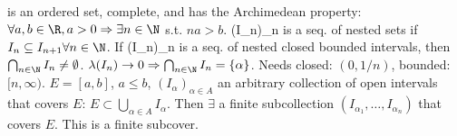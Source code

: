  is an ordered set, complete, and has the Archimedean property:
$\forall a, b \in \R, a > 0 \Rightarrow \exists n \in \N$ s.t. $na > b$.
 (I_n)_{n \in \N} is a seq. of nested sets if $I_n \subseteq I_{n+1} \forall n \in \N$.
If (I_n)_{n \in \N} is a seq. of nested closed bounded intervals, then $\bigcap_{n \in \N} I_n \neq \emptyset$.
$\lambda(I_n) \to 0 \Rightarrow \bigcap_{n \in \N} I_n = \{\alpha\}$.
Needs closed: $(0, 1/n)$, bounded: $[n, \infty)$.
 $E = [a, b]$, $a \le b$, $(I_\alpha)_{\alpha \in A}$ an arbitrary collection
of open intervals that covers $E$: $E \subset \bigcup_{\alpha \in A} I_\alpha$.
Then $\exists$ a finite subcollection $(I_{\alpha_1}, \dots, I_{\alpha_n})$
that covers $E$. This is a finite subcover.
